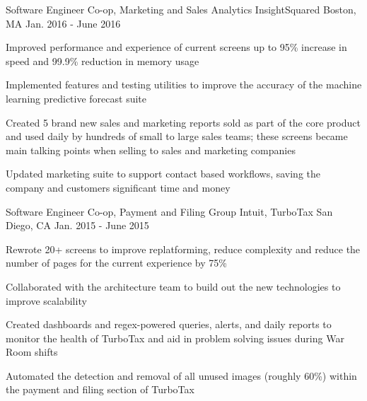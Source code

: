 

\begin{cventries}


  \cventry
    {Software Engineer Co-op, Marketing and Sales Analytics} %
    {InsightSquared} %
    {Boston, MA} %
    {Jan. 2016 - June 2016} %
    {
      \begin{cvitems} %
        \item {Improved performance and experience of current screens up to 95\% increase in speed and 99.9\% reduction in memory usage}
        \item {Implemented features and testing utilities to improve the accuracy of the machine learning predictive forecast suite}
        \item {Created 5 brand new sales and marketing reports sold as part of the core product and used daily by hundreds of small to large sales teams; these screens became main talking points when selling to sales and marketing companies}
        \item {Updated marketing suite to support contact based workflows, saving the company and customers significant time and money}
      \end{cvitems}
    }

  \cventry
    {Software Engineer Co-op, Payment and Filing Group} %
    {Intuit, TurboTax} %
    {San Diego, CA} %
    {Jan. 2015 - June 2015} %
    {
      \begin{cvitems} %
        \item {Rewrote 20+ screens to improve replatforming, reduce complexity and reduce the number of pages for the current experience by 75\%}
        \item {Collaborated with the architecture team to build out the new technologies to improve scalability}
        \item {Created dashboards and regex-powered queries, alerts, and daily reports to monitor the health of TurboTax and aid in problem solving issues during War Room shifts}
        \item {Automated the detection and removal of all unused images (roughly 60\%) within the payment and filing section of TurboTax}
      \end{cvitems}
    }


\end{cventries}
